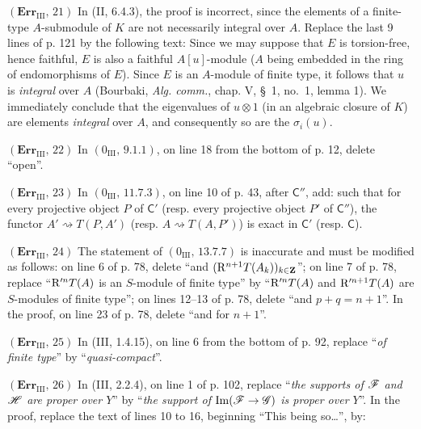 \noindent\textbf{$(\mathbf{Err}_{\mathrm{III}},\,21)$} In (II, 6.4.3), the
proof is incorrect, since the elements of a finite-type $A$-submodule of $K$
are not necessarily integral over $A$. Replace the last 9 lines of p. 121 by
the following text: Since we may suppose that $E$ is torsion-free, hence
faithful, $E$ is also a faithful $A[u]$-module ($A$ being embedded in the
ring of endomorphisms of $E$). Since $E$ is an $A$-module of finite type, it
follows that $u$ is \emph{integral} over $A$ (Bourbaki, \emph{Alg. comm.},
chap. V, \S~1, no.~1, lemma 1). We immediately conclude that the eigenvalues
of $u\otimes1$ (in an algebraic closure of $K$) are elements \emph{integral}
over $A$, and consequently so are the $\sigma_i(u)$.

\noindent\textbf{$(\mathbf{Err}_{\mathrm{III}},\,22)$} In
$(0_{\mathrm{III}},\,9.1.1)$, on line 18 from the bottom of p. 12, delete
``open''.

\noindent\textbf{$(\mathbf{Err}_{\mathrm{III}},\,23)$} In
$(0_{\mathrm{III}},\,11.7.3)$, on line 10 of p. 43, after $\mathsf C''$, add:
such that for every projective object $P$ of $\mathsf C'$ (resp. every
projective object $P'$ of $\mathsf C''$), the functor
$A'\rightsquigarrow T(P,A')$ (resp. $A\rightsquigarrow T(A,P')$) is exact in
$\mathsf C'$ (resp. $\mathsf C$).

\noindent\textbf{$(\mathbf{Err}_{\mathrm{III}},\,24)$} The statement of
$(0_{\mathrm{III}},\,13.7.7)$ is inaccurate and must be modified as follows:
on line 6 of p. 78, delete ``and
$(\mathrm{R}^{n+1}T(A_k))_{k\in\mathbf Z}$''; on line 7 of p. 78, replace
``$\mathrm{R}'^nT(A)$ is an $S$-module of finite type'' by ``$\mathrm{R}'^nT(A)$ and
$\mathrm{R}'^{n+1}T(A)$ are $S$-modules of finite type''; on lines 12--13 of p. 78,
delete ``and $p+q=n+1$''. In the proof, on line 23 of p. 78, delete ``and for
$n+1$''.

\noindent\textbf{$(\mathbf{Err}_{\mathrm{III}},\,25)$} In (III, 1.4.15), on
line 6 from the bottom of p. 92, replace ``\emph{of finite type}'' by
``\emph{quasi-compact}''.

\noindent\textbf{$(\mathbf{Err}_{\mathrm{III}},\,26)$} In (III, 2.2.4), on
line 1 of p. 102, replace ``\emph{the supports of $\mathscr{F}$ and $\mathscr{H}$ are
proper over $Y$}'' by ``\emph{the support of
$\operatorname{Im}(\mathscr{F}\to\mathscr{G})$ is proper over $Y$}''. In the proof,
replace the text of lines 10 to 16, beginning ``This being so\ldots{}'', by:


